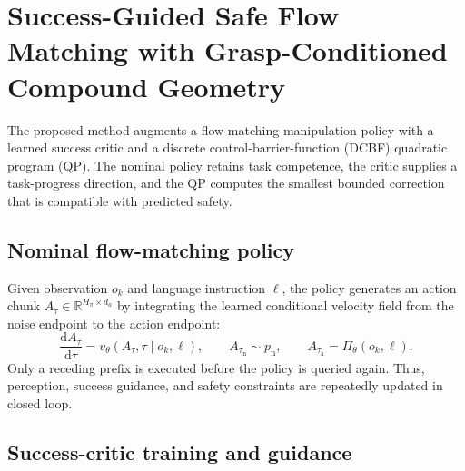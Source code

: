 \section{Success-Guided Safe Flow Matching with Grasp-Conditioned Compound Geometry}

The proposed method augments a flow-matching manipulation policy with a learned success critic and a discrete control-barrier-function (DCBF) quadratic program (QP). The nominal policy retains task competence, the critic supplies a task-progress direction, and the QP computes the smallest bounded correction that is compatible with predicted safety.

\subsection{Nominal flow-matching policy}

Given observation $o_k$ and language instruction $\ell$, the policy generates an action chunk $A_\tau\in\mathbb{R}^{H_\pi\times d_a}$ by integrating the learned conditional velocity field from the noise endpoint to the action endpoint:
\begin{equation}
    \frac{\mathrm{d}A_\tau}{\mathrm{d}\tau}
    =v_\theta\!\left(A_\tau,\tau\mid o_k,\ell\right),
    \qquad
    A_{\tau_{\mathrm{n}}}\sim p_{\mathrm{n}},
    \qquad
    A_{\tau_{\mathrm{a}}}=\Pi_\theta(o_k,\ell).
\end{equation}
Only a receding prefix is executed before the policy is queried again. Thus, perception, success guidance, and safety constraints are repeatedly updated in closed loop.

\subsection{Success-critic training and guidance}

